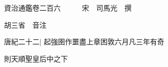 






























































資治通鑑卷二百六　　　宋　司馬光　撰

胡三省　音注

唐紀二十二|{
	起強圉作噩盡上章困敦六月凡三年有奇}


則天順聖皇后中之下

